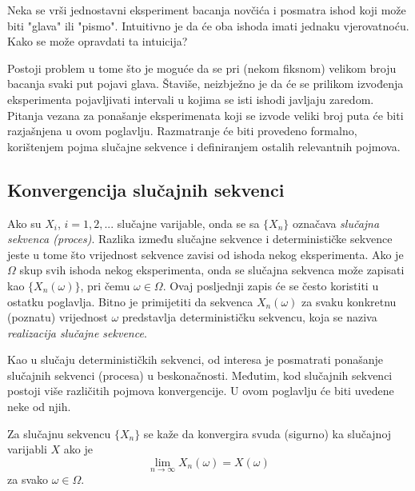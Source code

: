Neka se vrši jednostavni eksperiment bacanja novčića i posmatra ishod koji može
biti "glava" ili "pismo". Intuitivno je da će oba ishoda imati jednaku
vjerovatnoću. Kako se može opravdati ta intuicija?

Postoji problem u tome što je moguće da se pri (nekom fiksnom) velikom broju
bacanja svaki put pojavi glava. Štaviše, neizbježno je da će se prilikom
izvođenja eksperimenta pojavljivati intervali u kojima se isti ishodi javljaju
zaredom. Pitanja vezana za ponašanje eksperimenata koji se izvode veliki
broj puta će biti razjašnjena u ovom poglavlju. Razmatranje će biti provedeno
formalno, korištenjem pojma slučajne sekvence i definiranjem ostalih relevantnih
pojmova.

\subsection{Konvergencija slučajnih sekvenci}

Ako su $X_i$, $i=1,2,...$ slučajne varijable, onda se sa $\{X_n\}$ označava
\textit{slučajna sekvenca (proces)}. Razlika između slučajne sekvence i
determinističke sekvence jeste u tome što vrijednost sekvence zavisi od ishoda
nekog eksperimenta.  Ako je $\Omega$ skup svih ishoda nekog eksperimenta, onda
se slučajna sekvenca može zapisati kao $\{X_n(\omega)\}$, pri čemu $\omega \in
\Omega$. Ovaj posljednji zapis će se često koristiti u ostatku poglavlja. Bitno
je primijetiti da sekvenca $X_n(\omega)$ za svaku konkretnu (poznatu) vrijednost
$\omega$ predstavlja determinističku sekvencu, koja se naziva
\textit{realizacija slučajne sekvence}.

Kao u slučaju determinističkih sekvenci, od interesa je posmatrati ponašanje
slučajnih sekvenci (procesa) u beskonačnosti. Međutim, kod slučajnih sekvenci
postoji više različitih pojmova konvergencije. U ovom poglavlju će biti uvedene
neke od njih. 

\begin{definition}
  Za slučajnu sekvencu $\{X_n\}$ se kaže da konvergira svuda (sigurno) ka
  slučajnoj varijabli $X$ ako je
  \begin{equation}
    \lim_{n\to\infty} X_n(\omega) = X(\omega)
  \end{equation}
  za svako $\omega \in \Omega$.
\end{definition}


